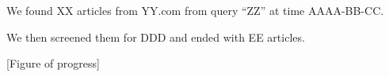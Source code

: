 We found XX articles from YY.com from query “ZZ” at time AAAA-BB-CC.

We then screened them for DDD and ended with EE articles.

[Figure of progress]